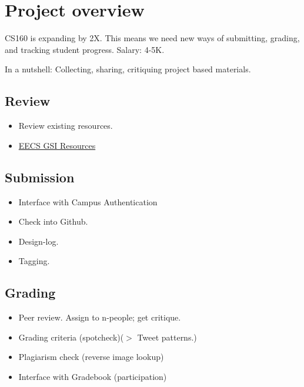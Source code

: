 \documentclass[12pt]{article} %
\begin{document}
\setlength{\pdfpageheight}{\paperheight}
\setlength{\pdfpagewidth}{\paperwidth}
\setlength{\parindent}{0pt} %
\setlength{\parskip}{2ex} %



\section{Project overview}
CS160 is expanding by 2X. This means we need new ways of submitting, grading, and tracking student progress. 
Salary: 4-5K.

In a nutshell: Collecting, sharing, critiquing project based materials. 




\subsection{Review}

\begin{itemize}
\item Review existing resources. 
\item \href{https://www.eecs.berkeley.edu/Students/gsi-resources.shtml}{EECS GSI Resources}
\end{itemize}

\subsection{Submission}
\begin{itemize}
\item Interface with Campus Authentication
\item Check into Github.
\item Design-log. 
\item Tagging. 
\end{itemize}

\subsection{Grading}
\begin{itemize}
\item Peer review. Assign to n-people; get critique.
\item Grading criteria (spotcheck)($>$ Tweet patterns.)
\item Plagiarism check (reverse image lookup)
\item Interface with Gradebook (participation)
\end{itemize}
\end{document}
